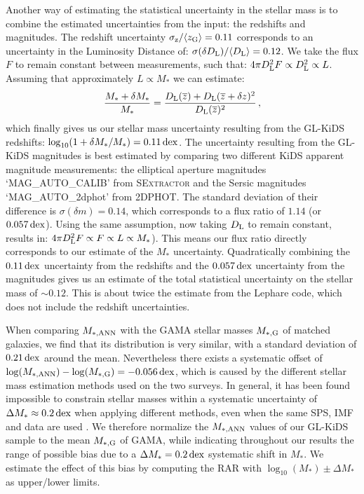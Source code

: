 \documentclass[usenatbib]{mnras}
\newcommand*{\meanl}[1]{\overline{#1}}
\newcommand*{\meanb}[1]{\langle{#1}\rangle}
\newcommand{\un}[1]{_{\rm #1}}
\newcommand{\dex}{\, {\rm dex}}
\begin{document}
Another way of estimating the statistical uncertainty in the stellar mass is to combine the estimated uncertainties from the input: the redshifts and magnitudes. The redshift uncertainty $\sigma\un{z}/\meanb{z\un{G}} = 0.11$ corresponds to an uncertainty in the Luminosity Distance of: $\sigma(\delta D\un{L})/\meanb{D\un{L}} = 0.12$. We take the flux $F$ to remain constant between measurements, such that: $4 \pi D\un{L}^2 F \propto D\un{L}^2 \propto L$. Assuming that approximately $L \propto M_*$ we can estimate: 
\begin{equation}
\frac{M_* + \delta M_*}{M_*} = \frac{D\un{L}(\meanl{z}) + D\un{L}(\meanl{z}+\delta z)^2}{D\un{L}(\meanl{z})^2} \, ,
\end{equation}
which finally gives us our stellar mass uncertainty resulting from the GL-KiDS redshifts: $\log_{10}(1+\delta M_*/M_*) = 0.11 \dex$. The uncertainty resulting from the GL-KiDS magnitudes is best estimated by comparing two different KiDS apparent magnitude measurements: the elliptical aperture magnitudes `MAG\_AUTO\_CALIB' from \textsc{SExtractor} and the Sersic magnitudes `MAG\_AUTO\_2dphot' from \textsc{2DPHOT}. The standard deviation of their difference is $\sigma(\delta m) = 0.14$, which corresponds to a flux ratio of $1.14$ (or $0.057 \dex$). Using the same assumption, now taking $D\un{L}$ to remain constant, results in: $4 \pi D\un{L}^2 F \propto F \propto L \propto M_*$). This means our flux ratio directly corresponds to our estimate of the $M_*$ uncertainty. Quadratically combining the $0.11 \dex$ uncertainty from the redshifts and the $0.057 \dex$ uncertainty from the magnitudes gives us an estimate of the total statistical uncertainty on the stellar mass of $\sim0.12$. This is about twice the estimate from the Lephare code, which does not include the redshift uncertainties.

When comparing $M\un{*,ANN}$ with the GAMA stellar masses $M\un{*,G}$ of matched galaxies, we find that its distribution is very similar, with a standard deviation of $0.21 \dex$ around the mean. Nevertheless there exists a systematic offset of $\log(M\un{*,ANN}) - \log(M\un{*,G}) = -0.056 \dex$, which is caused by the different stellar mass estimation methods used on the two surveys. In general, it has been found impossible to constrain stellar masses within a systematic uncertainty of $\Delta M_* \approx 0.2 \dex$ when applying different methods, even when the same SPS, IMF and data are used \cite[]{taylor2011,wright2017}. We therefore normalize the $M\un{*,ANN}$ values of our GL-KiDS sample to the mean $M\un{*,G}$ of GAMA, while indicating throughout our results the range of possible bias due to a $\Delta M_* = 0.2 \dex$ systematic shift in $M_*$. We estimate the effect of this bias by computing the RAR with $\log_{10}(M_*)\pm\Delta M_*$ as upper/lower limits.
\end{document}
